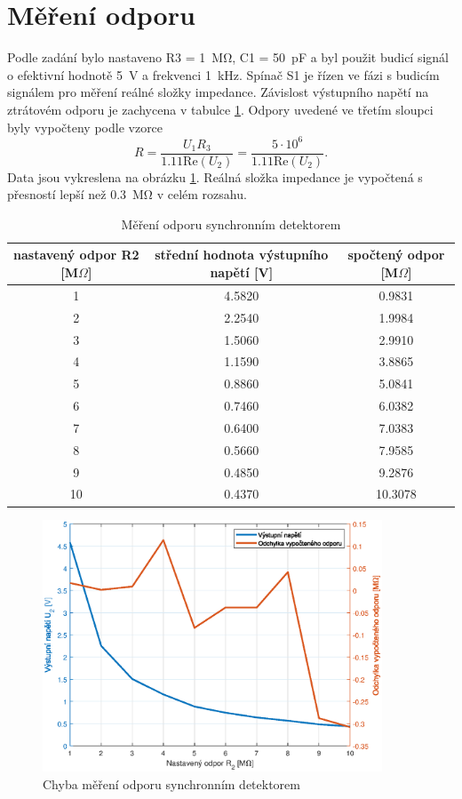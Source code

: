 \documentclass[twoside]{article}
\begin{document}
\clearpage
\section{Měření odporu}

Podle zadání bylo nastaveno R3 = \SI{1}{\mega\ohm}, C1 = \SI{50}{\pico\farad}
a byl použit budicí signál o efektivní hodnotě \SI{5}{\volt} a frekvenci \SI{1}{\kilo\hertz}.
Spínač S1 je řízen ve fázi s budicím signálem pro měření reálné složky impedance.
Závislost výstupního napětí na ztrátovém odporu je zachycena v tabulce \ref{tab-r}.
Odpory uvedené ve třetím sloupci byly vypočteny podle vzorce
\begin{equation}
    R = \frac{U_1 R_3}{1.11 \text{Re}(U_2)} = \frac{5 \cdot 10^6}{1.11 \text{Re}(U_2)}.
\end{equation}
Data jsou vykreslena na obrázku \ref{mereni-r}. Reálná složka impedance je vypočtená
s přesností lepší než \SI{0.3}{\mega\ohm} v celém rozsahu.

\begin{table}[h]
    \centering
    \begin{tabular}{c|c|c}
        nastavený odpor R2 [M$\Omega$] & střední hodnota výstupního napětí [V] & spočtený odpor [M$\Omega$] \\\hline
        1 & 4.5820 &   0.9831\\
        2 & 2.2540 &   1.9984\\
        3 & 1.5060 &   2.9910\\
        4 & 1.1590 &   3.8865\\
        5 & 0.8860 &   5.0841\\
        6 & 0.7460 &   6.0382\\
        7 & 0.6400 &   7.0383\\
        8 & 0.5660 &   7.9585\\
        9 & 0.4850 &   9.2876\\
       10 & 0.4370 &  10.3078\\
    \end{tabular}
    \caption{Měření odporu synchronním detektorem}
    \label{tab-r}
\end{table}

\begin{figure}[h]
    \centering
    \includegraphics[width=0.9\textwidth]{mereni-r.eps}
    \caption{Chyba měření odporu synchronním detektorem}
    \label{mereni-r}
\end{figure}
\end{document}
